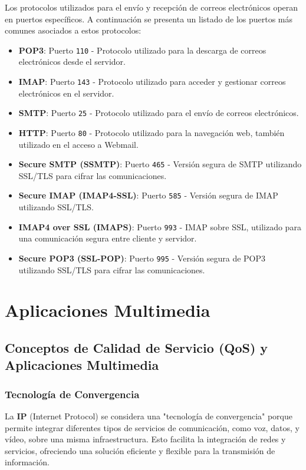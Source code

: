 \documentclass[a4paper,12pt]{article}
\begin{document}
Los protocolos utilizados para el envío y recepción de correos electrónicos operan en puertos específicos. A continuación se presenta un listado de los puertos más comunes asociados a estos protocolos:

\begin{itemize}
    \item \textbf{POP3}: Puerto \texttt{110} - Protocolo utilizado para la descarga de correos electrónicos desde el servidor.
    \item \textbf{IMAP}: Puerto \texttt{143} - Protocolo utilizado para acceder y gestionar correos electrónicos en el servidor.
    \item \textbf{SMTP}: Puerto \texttt{25} - Protocolo utilizado para el envío de correos electrónicos.
    \item \textbf{HTTP}: Puerto \texttt{80} - Protocolo utilizado para la navegación web, también utilizado en el acceso a Webmail.
    \item \textbf{Secure SMTP (SSMTP)}: Puerto \texttt{465} - Versión segura de SMTP utilizando SSL/TLS para cifrar las comunicaciones.
    \item \textbf{Secure IMAP (IMAP4-SSL)}: Puerto \texttt{585} - Versión segura de IMAP utilizando SSL/TLS.
    \item \textbf{IMAP4 over SSL (IMAPS)}: Puerto \texttt{993} - IMAP sobre SSL, utilizado para una comunicación segura entre cliente y servidor.
    \item \textbf{Secure POP3 (SSL-POP)}: Puerto \texttt{995} - Versión segura de POP3 utilizando SSL/TLS para cifrar las comunicaciones.
\end{itemize}

\section{Aplicaciones Multimedia}

\subsection{Conceptos de Calidad de Servicio (QoS) y Aplicaciones Multimedia}

\subsubsection{Tecnología de Convergencia}

La \textbf{IP} (Internet Protocol) se considera una "tecnología de convergencia" porque permite integrar diferentes tipos de servicios de comunicación, como voz, datos, y vídeo, sobre una misma infraestructura. Esto facilita la integración de redes y servicios, ofreciendo una solución eficiente y flexible para la transmisión de información.
\end{document}
